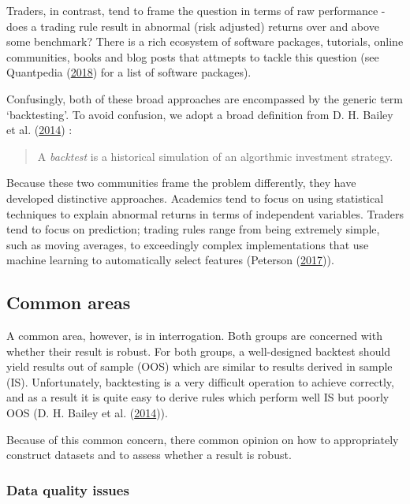 \documentclass[11pt,preprint, authoryear]{elsarticle}
\numberwithin{equation}{section}
\numberwithin{figure}{section}
\numberwithin{table}{section}
\begin{document}
Traders, in contrast, tend to frame the question in terms of raw
performance - does a trading rule result in abnormal (risk adjusted)
returns over and above some benchmark? There is a rich ecosystem of
software packages, tutorials, online communities, books and blog posts
that attmepts to tackle this question (see Quantpedia
(\protect\hyperlink{ref-Quantpedia2018}{2018}) for a list of software
packages).

Confusingly, both of these broad approaches are encompassed by the
generic term `backtesting'. To avoid confusion, we adopt a broad
definition from D. H. Bailey et al.
(\protect\hyperlink{ref-Bailey2014}{2014}) :

\begin{quote}
A \emph{backtest} is a historical simulation of an algorthmic investment
strategy.
\end{quote}

Because these two communities frame the problem differently, they have
developed distinctive approaches. Academics tend to focus on using
statistical techniques to explain abnormal returns in terms of
independent variables. Traders tend to focus on prediction; trading
rules range from being extremely simple, such as moving averages, to
exceedingly complex implementations that use machine learning to
automatically select features (Peterson
(\protect\hyperlink{ref-Peterson2017}{2017})).

\subsection{Common areas}\label{common-areas}

A common area, however, is in interrogation. Both groups are concerned
with whether their result is robust. For both groups, a well-designed
backtest should yield results out of sample (OOS) which are similar to
results derived in sample (IS). Unfortunately, backtesting is a very
difficult operation to achieve correctly, and as a result it is quite
easy to derive rules which perform well IS but poorly OOS (D. H. Bailey
et al. (\protect\hyperlink{ref-Bailey2014}{2014})).

Because of this common concern, there common opinion on how to
appropriately construct datasets and to assess whether a result is
robust.

\subsubsection{\texorpdfstring{Data quality
issues\label{Data Quality}}{Data quality issues}}\label{data-quality-issues}
\end{document}
